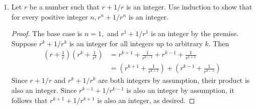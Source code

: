 \documentclass{article}
\begin{document}
\begin{enumerate}
\begin{proof}
			Then $g^2(a^2+b^2)=3g^2c^2\implies a^2+b^2=3c^2.$ Now, squares modulo 4 have residues 0 and 1 (since every integer is either $2k$ or $2k+1$ for some $k\in\ZZ$). We have $3c^2\equiv0$ or $3c^2\equiv3$ modulo 4, but only the former has a possible solution for $a$ and $b,$ in which case $a^2\equiv b^2\equiv 0\pmod 4.$ This means $a$ and $b$ are both even, but from above, we assumed $g$ was the GCD of $x$ and $y,$ so $\gcd(a, b)=1.$ Contradiction, so there are no other solutions.
		\end{proof}

	\item Let $r$ be a number such that $r+1/r$ is an integer. Use induction to show that for every positive integer $n, r^n+1/r^n$ is an integer.
		\begin{proof}
			The base case is $n=1,$ and $r^1+1/r^1$ is an integer by the premise. Suppose $r^k+1/r^k$ is an integer for all integers up to arbitrary $k.$ Then
			\begin{align*}
				\left( r+\frac{1}{r} \right)\left( r^k+\frac{1}{r^k} \right) &= r^{k+1}+\frac{1}{r^{k-1}} + r^{k-1} + \frac{1}{r^{k+1}} \\
				&= \left( r^{k+1}+\frac{1}{r^{k+1}} \right) + \left( r^{k-1} + \frac{1}{r^{k-1}} \right)
			\end{align*}
			Since $r+1/r$ and $r^k+1/r^k$ are both integers by assumption, their product is also an integer. Since $r^{k-1}+1/r^{k-1}$ is also an integer by assumption, it follows that $r^{k+1}+1/r^{k+1}$ is also an integer, as desired.
		\end{proof}
		
\end{enumerate}
\end{document}
